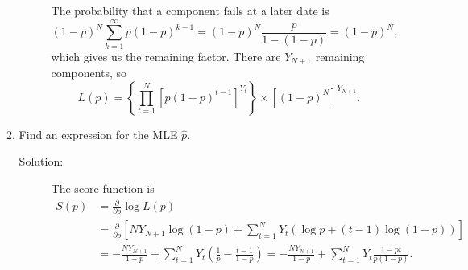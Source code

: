 \documentclass[letterpaper,11pt]{article}
\begin{document}
\begin{enumerate}
\begin{enumerate}
\begin{description}
      The probability that a component fails at a later date is
      \[
        \left(1 - p\right)^N\sum_{k=1}^\infty p\left(1-p\right)^{k-1}
        =
        \left(1 - p\right)^N\frac{p}{1 - \left(1 - p\right)}
        =
        \left(1 - p\right)^N,
      \]
      which gives us the remaining factor. There are $Y_{N+1}$ remaining
      components, so
      \[
        L\left(p\right) =
        \left\{
          \prod_{t=1}^N \left[
            p\left(1 - p \right)^{t-1}
          \right]^{Y_t}
        \right\}
        \times
        \left[\left(1-p\right)^N\right]^{Y_{N+1}}.
      \]
    \end{description}
  \item Find an expression for the MLE $\hat{p}$.
    \begin{description}
    \item[Solution:] 
      The score function is
      \begin{align}
        S\left(p\right)
        &= \frac{\partial}{\partial p}\log L\left(p\right) \nonumber\\
        &= \frac{\partial}{\partial p}\left[
          NY_{N + 1}\log\left(1 - p\right)
          + \sum_{t=1}^N Y_t\left(
          \log p + \left(t - 1\right)
          \log\left(1 - p\right)
          \right)
          \right]\nonumber\\
        &= -\frac{NY_{N+1}}{1 - p}
          + \sum_{t=1}^N Y_t\left(
          \frac{1}{p}
          -
          \frac{t - 1}{1 - p}
          \right)
        = -\frac{NY_{N+1}}{1 - p}
          + \sum_{t=1}^N Y_t
          \frac{1-pt}{p\left(1 - p\right)}.
          \label{eqn:p1_score}
      \end{align}


\end{description}
\end{enumerate}
\end{enumerate}
\end{document}
